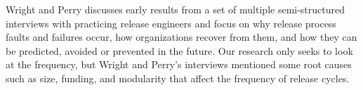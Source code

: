 \documentclass{acm_proc_article-sp}
\begin{document}
Wright and Perry \cite{WrightPitfalls} discusses early results from a set of multiple semi-structured interviews with practicing release engineers and focus on why release process faults and failures occur, how organizations recover from them, and how they can be predicted, avoided or prevented in the future.
Our research only seeks to look at the frequency, but Wright and Perry's interviews mentioned some root causes such as size, funding, and modularity that affect the frequency of release cycles.



\end{document}
